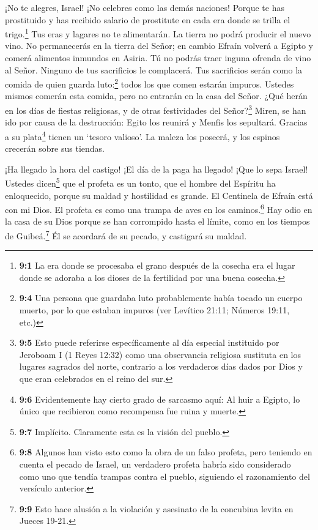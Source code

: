  ¡No te alegres, Israel! ¡No celebres como las demás
naciones! Porque te has prostituido y has recibido salario de prostitute
en cada era donde se trilla el trigo.\footnote{\textbf{9:1} La era donde
  se procesaba el grano después de la cosecha era el lugar donde se
  adoraba a los dioses de la fertilidad por una buena cosecha.}
 Tus eras y lagares no te alimentarán. La tierra no podrá
producir el nuevo vino.  No permanecerás en la tierra del
Señor; en cambio Efraín volverá a Egipto y comerá alimentos inmundos en
Asiria.  Tú no podrás traer inguna ofrenda de vino al Señor.
Ninguno de tus sacrificios le complacerá. Tus sacrificios serán como la
comida de quien guarda luto:\footnote{\textbf{9:4} Una persona que
  guardaba luto probablemente había tocado un cuerpo muerto, por lo que
  estaban impuros (ver Levítico 21:11; Números 19:11, etc.)} todos los
que comen estarán impuros. Ustedes mismos comerán esta comida, pero no
entrarán en la casa del Señor.  ¿Qué herán en los días de
fiestas religiosas, y de otras festividades del Señor?\footnote{\textbf{9:5}
  Esto puede referirse específicamente al día especial instituido por
  Jeroboam I (1 Reyes 12:32) como una observancia religiosa sustituta en
  los lugares sagrados del norte, contrario a los verdaderos días dados
  por Dios y que eran celebrados en el reino del sur.} 
Miren, se han ido por causa de la destrucción: Egito los reunirá y
Menfis los sepultará. Gracias a su plata\footnote{\textbf{9:6}
  Evidentemente hay cierto grado de sarcasmo aquí: Al huir a Egipto, lo
  único que recibieron como recompensa fue ruina y muerte.} tienen un
`tesoro valioso'. La maleza los poseerá, y los espinos crecerán sobre
sus tiendas.

 ¡Ha llegado la hora del castigo! ¡El día de la paga ha
llegado! ¡Que lo sepa Israel! Ustedes dicen\footnote{\textbf{9:7}
  Implícito. Claramente esta es la visión del pueblo.} que el profeta es
un tonto, que el hombre del Espíritu ha enloquecido, porque su maldad y
hostilidad es grande.  El Centinela de Efraín está con mi
Dios. El profeta es como una trampa de aves en los caminos.\footnote{\textbf{9:8}
  Algunos han visto esto como la obra de un falso profeta, pero teniendo
  en cuenta el pecado de Israel, un verdadero profeta habría sido
  considerado como uno que tendía trampas contra el pueblo, siguiendo el
  razonamiento del versículo anterior.} Hay odio en la casa de su Dios
 porque se han corrompido hasta el límite, como en los
tiempos de Guibeá.\footnote{\textbf{9:9} Esto hace alusión a la
  violación y asesinato de la concubina levita en Jueces 19-21.} Él se
acordará de su pecado, y castigará su maldad.

